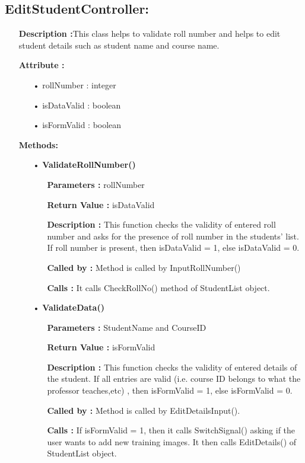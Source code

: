 \documentclass{scrreprt}
\begin{document}
\subsection{EditStudentController:}
\begin{enumerate}
\item[] \textbf{Description :}This class helps to validate roll number and helps to edit student details such as student name and course name.
\item[] \textbf{Attribute :} 
\begin{itemize}
\item [•] rollNumber : integer
\item [•] isDataValid : boolean
\item [•] isFormValid : boolean
\end{itemize}
\item [] \textbf{Methods:}
\begin{itemize}
\item [•] \textbf{ValidateRollNumber()}
\begin{itemize}
\item [] \textbf{Parameters :} rollNumber
\item [] \textbf{Return Value :} isDataValid
\item [] \textbf{Description :} This function checks the validity of entered roll number and asks for the presence of roll number in the students' list. If roll number is present, then isDataValid = 1, else isDataValid = 0.
\item [] \textbf{Called by :} Method is called by InputRollNumber()
\item [] \textbf{Calls :} It calls CheckRollNo() method of StudentList object.
\end{itemize}
\end{itemize}
\begin{itemize}
\item [•] \textbf{ValidateData()}
\begin{itemize}
\item [] \textbf{Parameters :} StudentName and CourseID
\item [] \textbf{Return Value :} isFormValid
\item [] \textbf{Description :} This function checks the validity of entered details of the student. If all entries are valid (i.e. course ID belongs to what the professor teaches,etc) , then isFormValid = 1, else isFormValid = 0. 
\item [] \textbf{Called by :} Method is called by EditDetailsInput().
\item [] \textbf{Calls :} If isFormValid = 1, then it calls SwitchSignal() asking if the user wants to add new training images. It then calls EditDetails() of StudentList object.
\end{itemize}
\end{itemize}
\end{enumerate}
\end{document}

